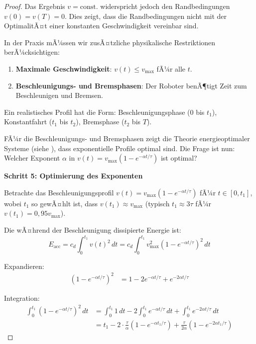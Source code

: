 ﻿\documentclass[a4paper,12pt]{article}
\theoremstyle{definition}
\begin{document}
\begin{proof}
Das Ergebnis $v = \text{const.}$ widerspricht jedoch den Randbedingungen $v(0) = v(T) = 0$. Dies zeigt, dass die Randbedingungen nicht mit der OptimalitÃ¤t einer konstanten Geschwindigkeit vereinbar sind.

In der Praxis mÃ¼ssen wir zusÃ¤tzliche physikalische Restriktionen berÃ¼cksichtigen:
\begin{enumerate}
\item \textbf{Maximale Geschwindigkeit}: $v(t) \leq v_{\max}$ fÃ¼r alle $t$.
\item \textbf{Beschleunigungs- und Bremsphasen}: Der Roboter benÃ¶tigt Zeit zum Beschleunigen und Bremsen.
\end{enumerate}

Ein realistisches Profil hat die Form: Beschleunigungsphase (0 bis $t_1$), Konstantfahrt ($t_1$ bis $t_2$), Bremsphase ($t_2$ bis $T$).

FÃ¼r die Beschleunigungs- und Bremsphasen zeigt die Theorie energieoptimaler Systeme (siehe \cite{phi_energy}), dass exponentielle Profile optimal sind. Die Frage ist nun: Welcher Exponent $\alpha$ in $v(t) = v_{\max}(1 - e^{-\alpha t/\tau})$ ist optimal?

\textbf{Schritt 5: Optimierung des Exponenten}

Betrachte das Beschleunigungsprofil $v(t) = v_{\max}(1 - e^{-\alpha t/\tau})$ fÃ¼r $t \in [0, t_1]$, wobei $t_1$ so gewÃ¤hlt ist, dass $v(t_1) \approx v_{\max}$ (typisch $t_1 \approx 3\tau$ fÃ¼r $v(t_1) = 0{,}95 v_{\max}$).

Die wÃ¤hrend der Beschleunigung dissipierte Energie ist:
\begin{equation}
E_{\text{acc}} = c_d \int_0^{t_1} v(t)^2 \, dt = c_d \int_0^{t_1} v_{\max}^2 (1 - e^{-\alpha t/\tau})^2 \, dt
\end{equation}

Expandieren:
\begin{align}
(1 - e^{-\alpha t/\tau})^2 &= 1 - 2e^{-\alpha t/\tau} + e^{-2\alpha t/\tau}
\end{align}

Integration:
\begin{align}
\int_0^{t_1} (1 - e^{-\alpha t/\tau})^2 \, dt &= \int_0^{t_1} 1 \, dt - 2\int_0^{t_1} e^{-\alpha t/\tau} \, dt + \int_0^{t_1} e^{-2\alpha t/\tau} \, dt \\
&= t_1 - 2 \cdot \frac{\tau}{\alpha}(1 - e^{-\alpha t_1/\tau}) + \frac{\tau}{2\alpha}(1 - e^{-2\alpha t_1/\tau})
\end{align}


\end{proof}
\end{document}

